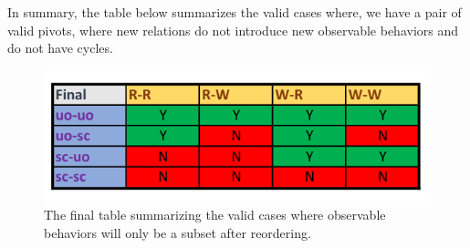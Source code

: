     In summary, the table below summarizes the valid cases where, we have a pair of valid pivots, where new relations do not introduce new observable behaviors and do not have cycles. 

    \begin{figure}[H]
        \centering
        \includegraphics[scale=0.7]{5.InstructionReordering/4.ValidReorderingCandidate/part4_table.pdf}
        \caption{The final table summarizing the valid cases where observable behaviors will only be a subset after reordering.}
        \label{fig:my_label}
    \end{figure}
